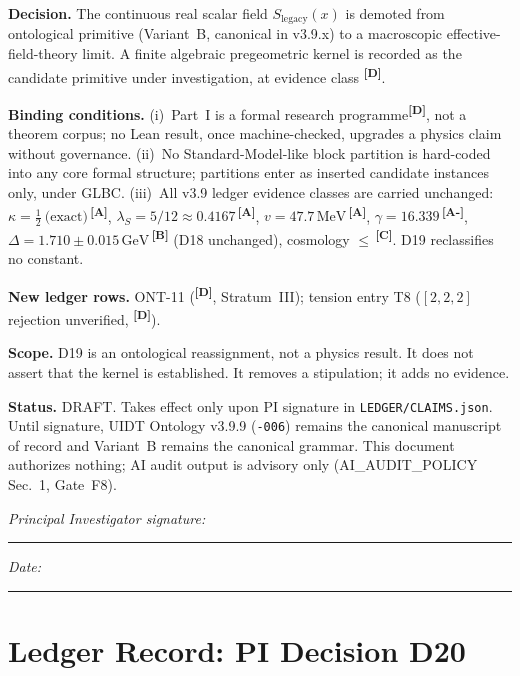 \documentclass[12pt,a4paper,twoside]{article}
\theoremstyle{plain}
\theoremstyle{definition}
\theoremstyle{remark}
\newcommand{\GeV}{\,\mathrm{GeV}}
\newcommand{\MeV}{\,\mathrm{MeV}}
\newcommand{\catmark}[1]{\textsuperscript{\textsf{\textbf{[#1]}}}}
\newcommand{\LegacySx}{S_{\mathrm{legacy}}(x)} %
\newcommand{\Sx}{\LegacySx} %
\newcommand{\lambdaS}{5/12 \approx 0.4167} %
\newcommand{\DeltaGap}{1.710 \pm 0.015\GeV} %
\newcommand{\GammaGeom}{16.339} %
\newcommand{\vVEV}{47.7\MeV} %
\newcommand{\KappaRG}{\tfrac{1}{2}\ \text{(exact)}} %
\begin{document}
\begin{pioverridebox}
\textbf{Decision.} The continuous real scalar field $\Sx$ is demoted
from ontological primitive (Variant~B, canonical in v3.9.x) to a
macroscopic effective-field-theory limit. A finite algebraic
pregeometric kernel is recorded as the candidate primitive under
investigation, at evidence class \catmark{D}.

\textbf{Binding conditions.}
(i)~Part~I is a formal research programme\catmark{D}, not a theorem
corpus; no Lean result, once machine-checked, upgrades a physics claim
without governance.
(ii)~No Standard-Model-like block partition is hard-coded into any core
formal structure; partitions enter as inserted candidate instances only,
under GLBC.
(iii)~All v3.9 ledger evidence classes are carried unchanged:
$\kappa = \KappaRG$\,\catmark{A}, $\lambda_S = \lambdaS$\,\catmark{A},
$v = \vVEV$\,\catmark{A}, $\gamma = \GammaGeom$\,\catmark{A-},
$\Delta = \DeltaGap$\,\catmark{B} (D18 unchanged), cosmology
$\leq$\,\catmark{C}. D19 reclassifies no constant.

\textbf{New ledger rows.} ONT-11 (\catmark{D}, Stratum~III);
tension entry T8 ($[2,2,2]$ rejection unverified, \catmark{D}).

\textbf{Scope.} D19 is an ontological reassignment, not a physics
result. It does not assert that the kernel is established. It removes a
stipulation; it adds no evidence.

\textbf{Status.} DRAFT. Takes effect only upon PI signature in
\texttt{LEDGER/CLAIMS.json}. Until signature, UIDT Ontology v3.9.9
(\texttt{-006}) remains the canonical manuscript of record and Variant~B
remains the canonical grammar. This document authorizes nothing; AI
audit output is advisory only (AI\_AUDIT\_POLICY Sec.~1, Gate~F8).

\medskip
\noindent\textit{Principal Investigator signature:}\\[1.4em]
\rule{6cm}{0.4pt}\qquad\textit{Date:}\ \rule{2.5cm}{0.4pt}
\end{pioverridebox}

\section{Ledger Record: PI Decision D20}
\label{sec:d20-ledger-record}
\end{document}
